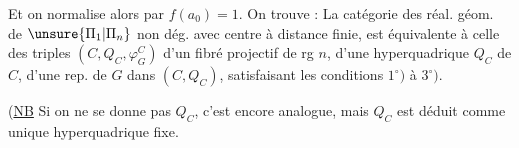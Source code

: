 Et on normalise alors par $f(a_0)=1$.
On trouve : La catégorie des réal. géom. de $\unsure{\Pi_1|\Pi_n}$ non dég.
avec centre à distance finie, est équivalente à celle des triples
$(C,Q_C,\varphi_G^C)$ d'un fibré projectif de rg $n$,
d'une hyperquadrique $Q_C$ de $C$, d'une rep. de $G$ dans $(C,Q_C)$,
satisfaisant les conditions $1^\circ)$ à $3^\circ)$.


(\uline{NB} Si on ne se donne pas $Q_C$, c'est encore analogue,
mais  $Q_C$ est déduit 
comme unique hyperquadrique fixe.


